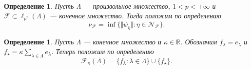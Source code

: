 \documentclass[12pt]{article}
\newtheorem{definition}[theorem]{Определение}
\begin{document}
\begin{definition}\label{ExtMorphsNormInf}
    Пусть $\Lambda$ --- произвольное множество, $1<p<+\infty$ 
    и $\mathcal{F}\subset\ell_{p^*}(\Lambda)$ --- конечное множество. 
    Тогда положим по определению
    \[
        \nu_{\mathcal{F}}=\inf\{
            \Vert\psi_{\eta}\Vert : \eta\in\mathcal{N}_{\mathcal{F}}
        \}.
    \]
\end{definition}

\begin{definition}\label{SpclFuncFam}
    Пусть $\Lambda$ --- конечное множество и $\kappa\in\mathbb{R}$. 
    Обозначим $f_\lambda=e_\lambda$ 
    и $f_{\star}=\kappa\sum_{\lambda\in\Lambda} e_\lambda$. 
    Теперь положим по определению
    \[
        \mathcal{F}_{\kappa}(\Lambda)
        =\{f_\lambda: \lambda\in\Lambda\}
        \cup
        \{f_\star\}.
    \]
\end{definition}
\end{document}
